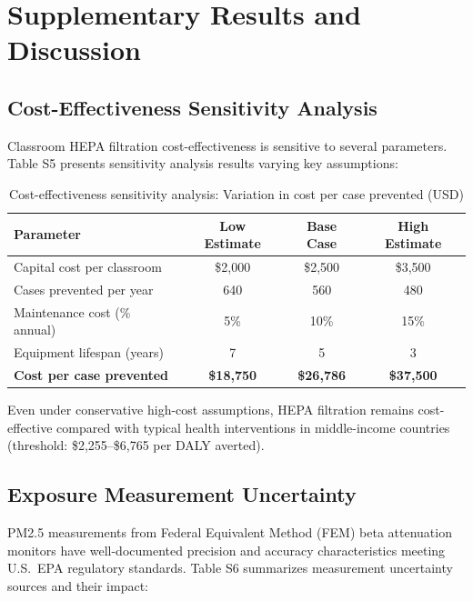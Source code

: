 \documentclass[11pt,a4paper]{article}
\begin{document}
\section{Supplementary Results and Discussion}

\subsection{Cost-Effectiveness Sensitivity Analysis}

Classroom HEPA filtration cost-effectiveness is sensitive to several parameters. Table S5 presents sensitivity analysis results varying key assumptions:

\begin{table}[H]
\centering
\caption{Cost-effectiveness sensitivity analysis: Variation in cost per case prevented (USD)}
\begin{tabular}{lccc}
\toprule
Parameter & Low Estimate & Base Case & High Estimate \\
\midrule
Capital cost per classroom & \$2,000 & \$2,500 & \$3,500 \\
Cases prevented per year & 640 & 560 & 480 \\
Maintenance cost (\% annual) & 5\% & 10\% & 15\% \\
Equipment lifespan (years) & 7 & 5 & 3 \\
\addlinespace
\textbf{Cost per case prevented} & \textbf{\$18,750} & \textbf{\$26,786} & \textbf{\$37,500} \\
\bottomrule
\end{tabular}
\end{table}

Even under conservative high-cost assumptions, HEPA filtration remains cost-effective compared with typical health interventions in middle-income countries (threshold: \$2,255--\$6,765 per DALY averted).

\subsection{Exposure Measurement Uncertainty}

PM2.5 measurements from Federal Equivalent Method (FEM) beta attenuation monitors have well-documented precision and accuracy characteristics meeting U.S.\ EPA regulatory standards. Table S6 summarizes measurement uncertainty sources and their impact:
\end{document}
